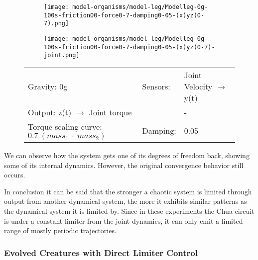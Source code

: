 \documentclass[main]{subfiles}
\begin{document}
\begin{figure}[H]
	\centering
		\begin{subfigure}[c]{0.45\textwidth}
	\texttt{[image: model-organisms/model-leg/Modelleg-0g-100s-friction00-force0-7-damping0-05-(x)yz(0-7).png]}
		\end{subfigure}
	\begin{subfigure}[c]{0.45\textwidth}
	\texttt{[image: model-organisms/model-leg/Modelleg-0g-100s-friction00-force0-7-damping0-05-(x)yz(0-7)-joint.png]}
		\end{subfigure}
	\caption[Limited chaotic controller controlling model leg]{}
	\begin{tabular}{l|ll}
	\hline 
	Gravity: 0g  & Sensors: & Joint Velocity \(\rightarrow\) y(t)\\
	 Output: z(t) \(\rightarrow\) Joint torque & & - \\
	  Torque scaling curve: \(0.7~(mass_1~\cdot~mass_2)\) & Damping: & 0.05 \\
	  \hline
	\end{tabular}

	\label{figure:limited-damped-model-leg8}
\end{figure}

We can observe how the system gets one of its degrees of freedom back, showing some of its internal dynamics. However, the original convergence behavior still occurs.

In conclusion it can be said that the stronger a chaotic system is limited through output from another dynamical system, the more it exhibits similar patterns as the dynamical system it is limited by. Since in these experiments the Chua circuit is under a constant limiter from the joint dynamics, it can only emit a limited range of mostly periodic trajectories.

\subsubsection{Evolved Creatures with Direct Limiter Control}
\label{subsec:Evolved-lim-creatures}

\end{document}
